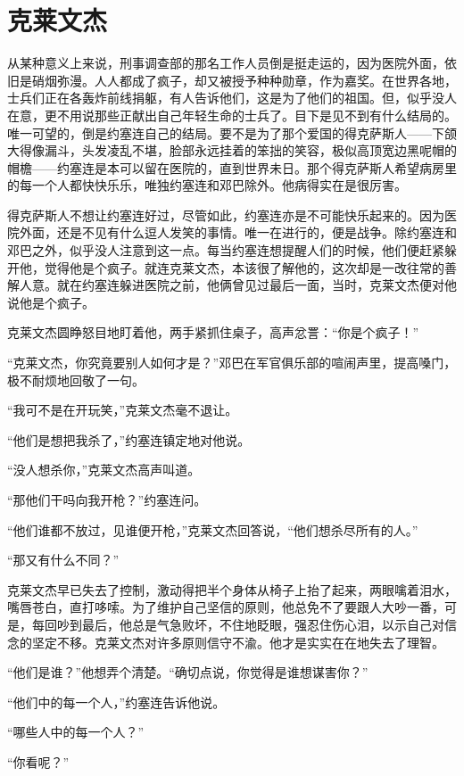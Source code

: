 \chapter{克莱文杰}
 
    从某种意义上来说，刑事调查部的那名工作人员倒是挺走运的，因为医院外面，依旧是硝烟弥漫。人人都成了疯子，却又被授予种种勋章，作为嘉奖。在世界各地，士兵们正在各轰炸前线捐躯，有人告诉他们，这是为了他们的祖国。但，似乎没人在意，更不用说那些正献出自己年轻生命的士兵了。目下是见不到有什么结局的。唯一可望的，倒是约塞连自己的结局。要不是为了那个爱国的得克萨斯人——下颌大得像漏斗，头发凌乱不堪，脸部永远挂着的笨拙的笑容，极似高顶宽边黑呢帽的帽檐——约塞连是本可以留在医院的，直到世界未日。那个得克萨斯人希望病房里的每一个人都快快乐乐，唯独约塞连和邓巴除外。他病得实在是很厉害。

    得克萨斯人不想让约塞连好过，尽管如此，约塞连亦是不可能快乐起来的。因为医院外面，还是不见有什么逗人发笑的事情。唯一在进行的，便是战争。除约塞连和邓巴之外，似乎没人注意到这一点。每当约塞连想提醒人们的时候，他们便赶紧躲开他，觉得他是个疯子。就连克莱文杰，本该很了解他的，这次却是一改往常的善解人意。就在约塞连躲进医院之前，他俩曾见过最后一面，当时，克莱文杰便对他说他是个疯子。

    克莱文杰圆睁怒目地盯着他，两手紧抓住桌子，高声忿詈：“你是个疯子！”

    “克莱文杰，你究竟要别人如何才是？”邓巴在军官俱乐部的喧闹声里，提高嗓门，极不耐烦地回敬了一句。

    “我可不是在开玩笑，”克莱文杰毫不退让。

    “他们是想把我杀了，”约塞连镇定地对他说。

    “没人想杀你，”克莱文杰高声叫道。

    “那他们干吗向我开枪？”约塞连问。

    “他们谁都不放过，见谁便开枪，”克莱文杰回答说，“他们想杀尽所有的人。”

    “那又有什么不同？”

    克莱文杰早已失去了控制，激动得把半个身体从椅子上抬了起来，两眼噙着泪水，嘴唇苍白，直打哆嗦。为了维护自己坚信的原则，他总免不了要跟人大吵一番，可是，每回吵到最后，他总是气急败坏，不住地眨眼，强忍住伤心泪，以示自己对信念的坚定不移。克莱文杰对许多原则信守不渝。他才是实实在在地失去了理智。

    “他们是谁？”他想弄个清楚。“确切点说，你觉得是谁想谋害你？”

    “他们中的每一个人，”约塞连告诉他说。

    “哪些人中的每一个人？”

    “你看呢？”

